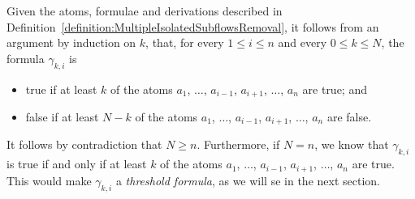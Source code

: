 \begin{remark}\label{remark:FromGammasToThresholds}
Given the atoms, formulae and derivations described in Definition~\ref{definition:MultipleIsolatedSubflowsRemoval}, it follows from an argument by induction on $k$, that, for every $1\le i\le n$ and every $0\le k\le N$, the formula $\gamma_{k,i}$ is
\begin{itemize}
 \item true if at least $k$ of the atoms $a_1$, $\dots$, $a_{i-1}$, $a_{i+1}$, $\dots$, $a_n$ are true; and
 \item false if at least $N-k$ of the atoms $a_1$, $\dots$, $a_{i-1}$, $a_{i+1}$, $\dots$, $a_n$ are false.
\end{itemize}
It follows by contradiction that $N\ge n$. Furthermore, if $N=n$, we know that $\gamma_{k,i}$ is true if and only if at least $k$ of the atoms $a_1$, $\dots$, $a_{i-1}$, $a_{i+1}$, $\dots$, $a_n$ are true. This would make $\gamma_{k,i}$ a \emph{threshold formula}, as we will se in the next section.
\end{remark}

